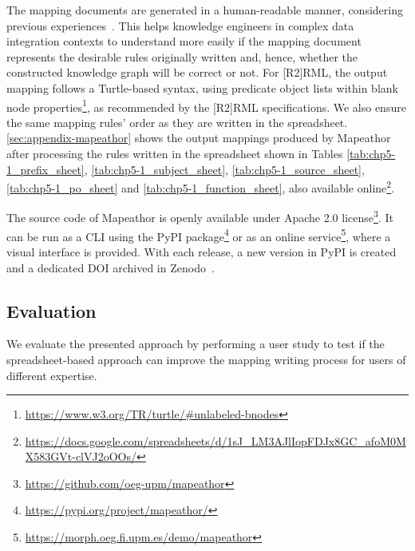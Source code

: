 The mapping documents are generated in a human-readable manner, considering previous experiences~\parencite{chaves2022systematic,corcho2021high,chaves2020bench}.
This helps knowledge engineers in complex data integration contexts to understand more easily if the mapping document represents the desirable rules originally written and, hence, whether the constructed knowledge graph will be correct or not. 
For [R2]RML, the output mapping follows a Turtle-based syntax, using predicate object lists within blank node properties\footnote{\url{https://www.w3.org/TR/turtle/\#unlabeled-bnodes}}, as recommended by the [R2]RML specifications.
We also ensure the same mapping rules' order as they are written in the spreadsheet.
\cref{sec:appendix-mapeathor} shows the output mappings produced by Mapeathor after processing the rules written in the spreadsheet shown in Tables \ref{tab:chp5-1_prefix_sheet}, \ref{tab:chp5-1_subject_sheet}, \ref{tab:chp5-1_source_sheet}, \ref{tab:chp5-1_po_sheet} and \ref{tab:chp5-1_function_sheet}, also available online\footnote{\url{https://docs.google.com/spreadsheets/d/1sJ_LM3AJlIopFDJx8GC_afoM0MX583GVt-clVJ2oOOs/}}.




The source code of Mapeathor is openly available under Apache 2.0 license\footnote{\url{https://github.com/oeg-upm/mapeathor}}. It can be run as a CLI using the PyPI package\footnote{\url{https://pypi.org/project/mapeathor/}} or as an online service\footnote{\url{https://morph.oeg.fi.upm.es/demo/mapeathor}}, where a visual interface is provided. With each release, a new version in PyPI is created and a dedicated DOI archived in Zenodo~\parencite{iglesias-molina_2023_5973906}. 




\subsection{Evaluation}
We evaluate the presented approach by performing a user study to test %
if the spreadsheet-based approach can improve the mapping writing process for users of different expertise. 

